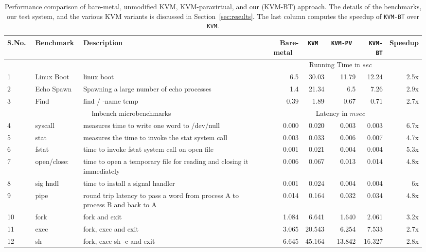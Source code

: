 \documentclass[10pt,twocolumn]{article}
\begin{document}
\begin{table}
\centering
      \begin{tabular}{|l@{}| l@{}|p{3.8cm} | r r r r r|} \hline
        S.No.\verb, ,&  Benchmark\verb, ,& Description  & Bare-metal \verb, ,& {\tt KVM} \verb, , & {\tt KVM-PV} \verb, ,& {\tt KVM-BT}& Speedup \\ \hline

     &&& \multicolumn{5}{c|}{ Running Time in $sec$}\\\cline {4-8}  
      1&  Linux Boot& linux boot & 6.5	&	30.03	&	11.79	&	12.24 & 2.5x \\ \hline
      2& Echo Spawn	& Spawning a large number of echo processes&1.4	&	21.34	&	6.5	&	7.26& 2.9x \\\hline
      3& Find	& find / -name temp & 0.39	&	1.89	&	0.67	&	0.71 & 2.7x\\ \hline
	   \multicolumn{3}{|c|}{ lmbench microbenchmarks }& \multicolumn{5}{c|}{Latency in $msec$}\\  \hline

4	&	syscall	&	 measures time to write one word to /dev/null	&	0.000	&	0.020	&	0.003	&	0.003 & 6.7x	\\	\hline
5	&	stat	&	 measures the time to invoke the stat system call	&	0.003	&	0.033	&	0.006	&	0.007& 4.7x	\\	\hline
6	&	fstat	&	time to invoke fstat system call on open file 	&	0.001	&	0.021	&	0.004	&	0.004&5.3x	\\	\hline
7	&	open/close:	&	 time to open a temporary file for reading and closing it immediately 	&	0.006	&	0.067	&	0.013	&	0.014&4.8x	\\	\hline
8	&	sig hndl	&	 time to install a signal handler	&	0.001	&	0.024	&	0.004	&	0.004	& 6x\\	\hline
9	&	pipe 	&	 round trip latency to pass a word from process A to process B and back to A	&	0.014	&	0.164	&	0.032	&	0.034&4.8x	\\	\hline
10	&	fork	&	 fork and exit 	&	1.084	&	6.641	&	1.640	&	2.061&3.2x	\\	\hline
11	&	exec	&	 fork, exec and exit	&	3.065	&	20.543	&	6.254	&	7.533&2.7x	\\	\hline
12	&	sh	&	 fork, exec sh -c and exit	&	6.645	&	45.164	&	13.842	&	16.327&2.8x	\\	\hline



        \hline
      \end{tabular}
\caption{Performance comparison of bare-metal, unmodified KVM, KVM-paravirtual, and our (KVM-BT) approach. The details of
the benchmarks, our test system, and the various KVM variants is discussed in Section~\ref{sec:results}. The last column computes the speedup of {\tt KVM-BT} over {\tt KVM}.}
\label{tab:kvm_performance}
\end{table} 
\end{document}
